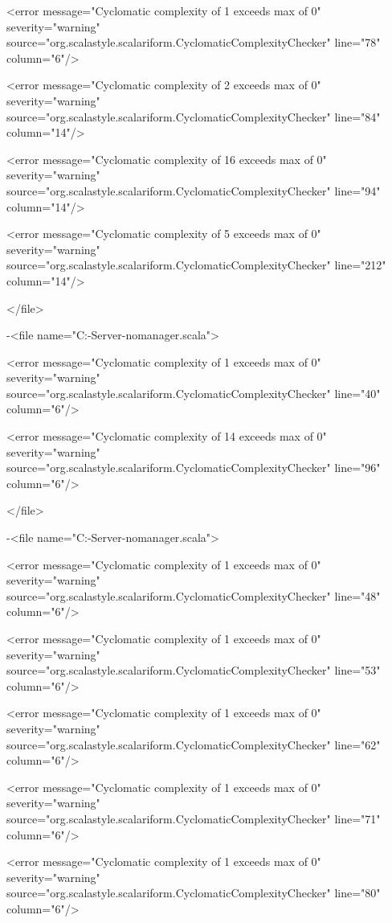 \documentclass{scalatekids-article}
\begin{document}
<error message="Cyclomatic complexity of 1 exceeds max of 0" severity="warning" source="org.scalastyle.scalariform.CyclomaticComplexityChecker" line="78" column="6"/>

<error message="Cyclomatic complexity of 2 exceeds max of 0" severity="warning" source="org.scalastyle.scalariform.CyclomaticComplexityChecker" line="84" column="14"/>

<error message="Cyclomatic complexity of 16 exceeds max of 0" severity="warning" source="org.scalastyle.scalariform.CyclomaticComplexityChecker" line="94" column="14"/>

<error message="Cyclomatic complexity of 5 exceeds max of 0" severity="warning" source="org.scalastyle.scalariform.CyclomaticComplexityChecker" line="212" column="14"/>

</file>


-<file name="C:\Users\Davide\Desktop\Actorbase-Server-nomanager\src\main\scala\com\actorbase\actorsystem\userkeeper\Userkeeper.scala">

<error message="Cyclomatic complexity of 1 exceeds max of 0" severity="warning" source="org.scalastyle.scalariform.CyclomaticComplexityChecker" line="40" column="6"/>

<error message="Cyclomatic complexity of 14 exceeds max of 0" severity="warning" source="org.scalastyle.scalariform.CyclomaticComplexityChecker" line="96" column="6"/>

</file>


-<file name="C:\Users\Davide\Desktop\Actorbase-Server-nomanager\src\main\scala\com\actorbase\actorsystem\utils\ActorbaseCollection.scala">

<error message="Cyclomatic complexity of 1 exceeds max of 0" severity="warning" source="org.scalastyle.scalariform.CyclomaticComplexityChecker" line="48" column="6"/>

<error message="Cyclomatic complexity of 1 exceeds max of 0" severity="warning" source="org.scalastyle.scalariform.CyclomaticComplexityChecker" line="53" column="6"/>

<error message="Cyclomatic complexity of 1 exceeds max of 0" severity="warning" source="org.scalastyle.scalariform.CyclomaticComplexityChecker" line="62" column="6"/>

<error message="Cyclomatic complexity of 1 exceeds max of 0" severity="warning" source="org.scalastyle.scalariform.CyclomaticComplexityChecker" line="71" column="6"/>

<error message="Cyclomatic complexity of 1 exceeds max of 0" severity="warning" source="org.scalastyle.scalariform.CyclomaticComplexityChecker" line="80" column="6"/>
\end{document}

